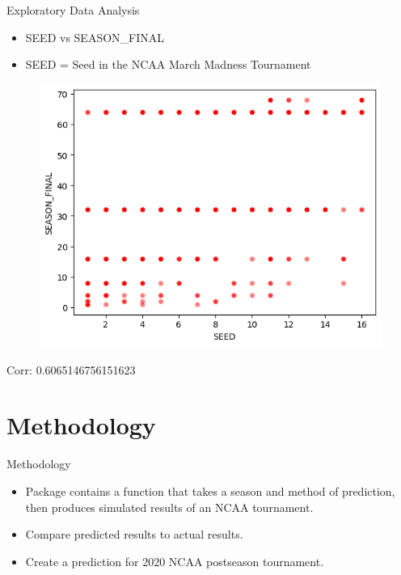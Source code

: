 \documentclass{beamer}
\begin{document}
\begin{frame}{Exploratory Data Analysis}
  \begin{center}
    \begin{itemize}
        \item SEED vs SEASON\_FINAL
        \item SEED = Seed in the NCAA March Madness Tournament
    \end{itemize}

    \begin{figure}
      \centering
      \includegraphics[width=0.5\linewidth]{seedscatterplot.png} %
    \end{figure}

    \vspace{0.1cm}

    Corr: 0.6065146756151623
  \end{center}
\end{frame}

\section{Methodology}

\begin{frame}{Methodology}
\begin{itemize}
  \item Package contains a function that takes a season and method of prediction, then produces simulated results of an NCAA tournament.
  \item Compare predicted results to actual results.
  \item Create a prediction for 2020 NCAA postseason tournament.
\end{itemize}
\end{frame}
\end{document}
